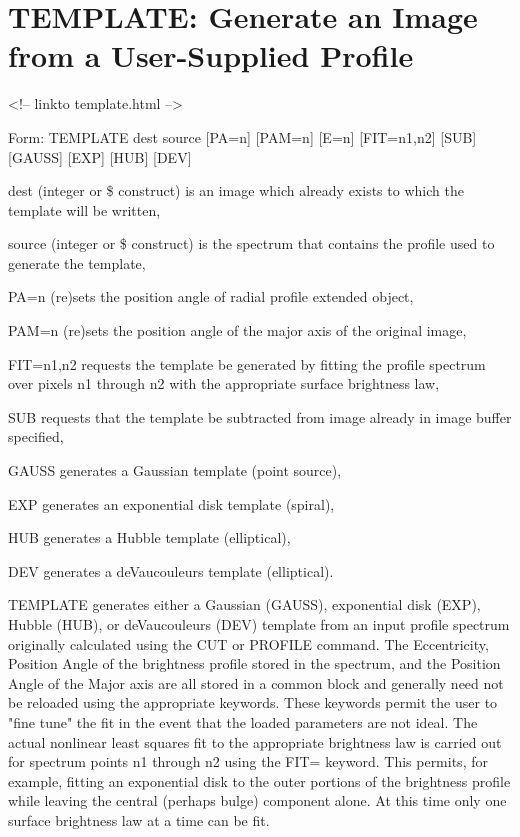 \section{TEMPLATE: Generate an Image from a User-Supplied Profile}
\begin{rawhtml}
<!-- linkto template.html -->
\end{rawhtml}
\begin{command}
  \item[Form: TEMPLATE dest source {[PA=n]} {[PAM=n]} {[E=n]} {[FIT=n1,n2]}
       {[SUB]} {[GAUSS]} {[EXP]} {[HUB]} {[DEV]}\hfill]{}
  \item[dest]{(integer or \$ construct) is an image which already 
       exists to which the template will be written,}
  \item[source]{(integer or \$ construct) is the spectrum that
       contains the profile used to generate the template,}
  \item[PA=n]{(re)sets the position angle of radial profile
       extended object,}
  \item[PAM=n]{(re)sets the position angle of the major axis
       of the original image,}
  \item[FIT=n1,n2]{requests the template be generated by fitting
       the profile spectrum over pixels n1 through n2
       with the appropriate surface brightness law,}
  \item[SUB]{requests that the template be subtracted from
       image already in image buffer specified,}
  \item[GAUSS]{generates a Gaussian template (point source),}
  \item[EXP]{generates an exponential disk template (spiral),}
  \item[HUB]{generates a Hubble template (elliptical),}
  \item[DEV]{generates a deVaucouleurs template (elliptical).}
\end{command}

TEMPLATE generates either a Gaussian (GAUSS), exponential disk (EXP),
Hubble (HUB), or deVaucouleurs (DEV) template from an input profile spectrum
originally calculated using the CUT or PROFILE command.  The Eccentricity,
Position Angle of the brightness profile stored in the spectrum, and the
Position Angle of the Major axis are all stored in a common block and
generally need not be reloaded using the appropriate keywords.  These
keywords permit the user to "fine tune" the fit in the event that the
loaded parameters are not ideal.  The actual nonlinear least squares fit to
the appropriate brightness law is carried out for spectrum points n1
through n2 using the FIT= keyword.  This permits, for example, fitting an
exponential disk to the outer portions of the brightness profile while
leaving the central (perhaps bulge) component alone.  At this time only one
surface brightness law at a time can be fit.

